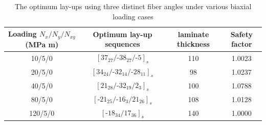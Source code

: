 \documentclass{article}
\begin{document}
\begin{table}
\caption{The optimum lay-ups using three distinct fiber angles under various biaxial loading cases}
\label{T300/5308 material properties}
\centering
\begin{tabular}{cccc}
	\toprule
	Loading	$N_{x}/N_{y}/N_{xy}$ (MPa m)	       & Optimum lay-up sequences                                   & laminate thickness &  Safety factor \\
	\midrule
	10/5/0                                         &  $[37_{27}/\text{-}38_{27}/\text{-}5]_s$                   &     110               &  1.0023 \\
	20/5/0                                         &  $[34_{24}/\text{-}32_{14}/\text{-}28_{11}]_s$             &     98               &  1.0237 \\
	40/5/0                                         &  $[21_{28}/\text{-}32_{19}/2_3]_s$                         &     100               &  1.0788 \\
	80/5/0                                         &  $[\text{-}21_{25}/\text{-}16_{3}/21_{26}]_s$              &     108               &  1.0128 \\
	120/5/0                                         &  $[\text{-}18_{34}/17_{36}]_s$                            &     140               &  1.0000 \\
	\bottomrule
\end{tabular}
\end{table}

\end{document}
